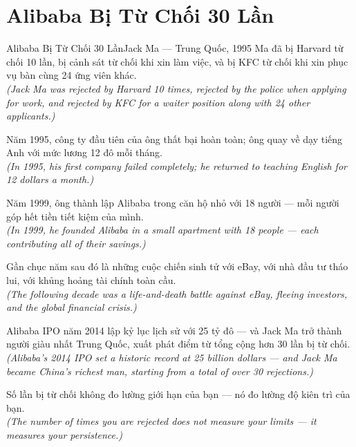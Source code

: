 \section{Alibaba Bị Từ Chối 30 Lần}
\begin{truyen}{Alibaba Bị Từ Chối 30 Lần}{Jack Ma --- Trung Quốc, 1995}
 Ma đã bị Harvard từ chối 10 lần, bị cảnh sát từ chối khi xin làm việc, và bị KFC từ chối khi xin phục vụ bàn cùng 24 ứng viên khác.\\[4pt]
\textit{(Jack Ma was rejected by Harvard 10 times, rejected by the police when applying for work, and rejected by KFC for a waiter position along with 24 other applicants.)}

Năm 1995, công ty đầu tiên của ông thất bại hoàn toàn; ông quay về dạy tiếng Anh với mức lương 12 đô mỗi tháng.\\[4pt]
\textit{(In 1995, his first company failed completely; he returned to teaching English for 12 dollars a month.)}

Năm 1999, ông thành lập Alibaba trong căn hộ nhỏ với 18 người --- mỗi người góp hết tiền tiết kiệm của mình.\\[4pt]
\textit{(In 1999, he founded Alibaba in a small apartment with 18 people --- each contributing all of their savings.)}

Gần chục năm sau đó là những cuộc chiến sinh tử với eBay, với nhà đầu tư tháo lui, với khủng hoảng tài chính toàn cầu.\\[4pt]
\textit{(The following decade was a life-and-death battle against eBay, fleeing investors, and the global financial crisis.)}

Alibaba IPO năm 2014 lập kỷ lục lịch sử với 25 tỷ đô --- và Jack Ma trở thành người giàu nhất Trung Quốc, xuất phát điểm từ tổng cộng hơn 30 lần bị từ chối.\\[4pt]
\textit{(Alibaba's 2014 IPO set a historic record at 25 billion dollars --- and Jack Ma became China's richest man, starting from a total of over 30 rejections.)}

\end{truyen}
\begin{baihoc}
  Số lần bị từ chối không đo lường giới hạn của bạn --- nó đo lường độ kiên trì của bạn.\\[4pt]
  \textit{(The number of times you are rejected does not measure your limits --- it measures your persistence.)}
\end{baihoc}

